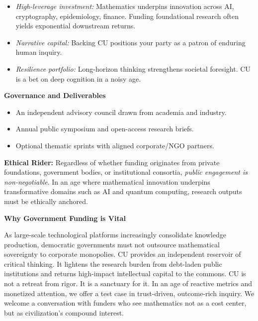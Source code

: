\begin{tcolorbox}[colback=gray!5, colframe=black, boxrule=0.3mm, sharp corners, width=\dimexpr\textwidth+1.1cm\relax, enlarge left by=0mm]
{{\scriptsize
\begin{itemize}
  \setlength\itemsep{2pt}
  \setlength\parsep{0pt}
  \item \textit{High-leverage investment:} Mathematics underpins innovation across AI, cryptography, epidemiology, finance. Funding foundational research often yields exponential downstream returns.
  \item \textit{Narrative capital:} Backing CU positions your party as a patron of enduring human inquiry.
  \item \textit{Resilience portfolio:} Long-horizon thinking strengthens societal foresight. CU is a bet on deep cognition in a noisy age.
\end{itemize}
}
}
\end{tcolorbox}

\begin{tcolorbox}[colback=gray!5, colframe=black, boxrule=0.3mm, sharp corners, width=\dimexpr\linewidth+1cm\relax
, enlarge left by=0mm]
{\scriptsize\ttfamily

\vspace{0.8em}
\noindent\textbf{Governance and Deliverables}

{\scriptsize
\begin{itemize}
  \setlength\itemsep{2pt}
  \setlength\parsep{0pt}
  \item An independent advisory council drawn from academia and industry.
  \item Annual public symposium and open-access research briefs.
  \item Optional thematic sprints with aligned corporate/NGO partners.
\end{itemize}
}

\textbf{Ethical Rider:} Regardless of whether funding originates from private foundations, government bodies, or institutional consortia, \textit{public engagement is non-negotiable}. In an age where mathematical innovation underpins transformative domains such as AI and quantum computing, research outputs must be ethically anchored.

\vspace{0.8em}
\noindent\textbf{Why Government Funding is Vital}
\vspace{0.3em}

As large-scale technological platforms increasingly consolidate knowledge production, democratic governments must not outsource mathematical sovereignty to corporate monopolies. CU provides an independent reservoir of critical thinking. It lightens the research burden from debt-laden public institutions and returns high-impact intellectual capital to the commons. CU is not a retreat from rigor. It is a sanctuary for it. In an age of reactive metrics and monetized attention, we offer a test case in trust-driven, outcome-rich inquiry. We welcome a conversation with funders who see mathematics not as a cost center, but as civilization's compound interest.

}
\end{tcolorbox}

